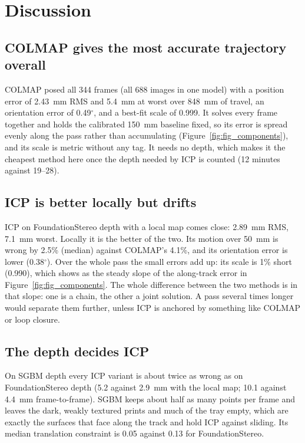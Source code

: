 \section{Discussion}

\subsection{COLMAP gives the most accurate trajectory overall}
COLMAP posed all 344 frames (all 688 images in one model) with a position error of 2.43~mm RMS and 5.4~mm at
worst over 848~mm of travel, an orientation error of 0.49$^\circ$, and a best-fit scale of 0.999. It solves every
frame together and holds the calibrated 150~mm baseline fixed, so its error is spread evenly along the pass rather
than accumulating (Figure~\ref{fig:fig_components}), and its scale is metric without any tag. It needs no depth,
which makes it the cheapest method here once the depth needed by ICP is counted (12 minutes against 19--28).

\subsection{ICP is better locally but drifts}
ICP on FoundationStereo depth with a local map comes close: 2.89~mm RMS, 7.1~mm worst. Locally it is the better of
the two. Its motion over 50~mm is wrong by 2.5\% (median) against COLMAP's 4.1\%, and its orientation error is
lower (0.38$^\circ$). Over the whole pass the small errors add up: its scale is 1\% short (0.990), which shows as
the steady slope of the along-track error in Figure~\ref{fig:fig_components}. The whole difference between the two
methods is in that slope: one is a chain, the other a joint solution. A pass several times longer would separate
them further, unless ICP is anchored by something like COLMAP or loop closure.

\subsection{The depth decides ICP}
On SGBM depth every ICP variant is about twice as wrong as on FoundationStereo depth (5.2 against 2.9~mm with the
local map; 10.1 against 4.4~mm frame-to-frame). SGBM keeps about half as many points per frame and leaves the
dark, weakly textured prints and much of the tray empty, which are exactly the surfaces that face along the track
and hold ICP against sliding. Its median translation constraint is 0.05 against 0.13 for FoundationStereo.

